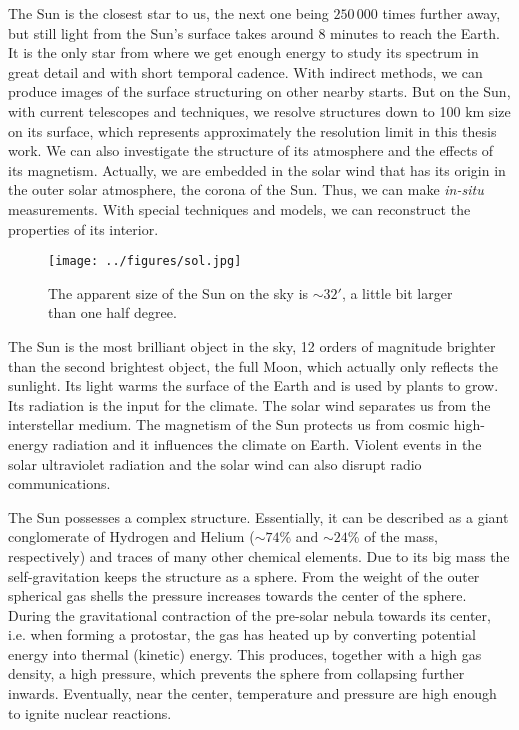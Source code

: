 The Sun is the closest star to us, the next one being $250\, 000$ times further away, but still light from the Sun's surface takes around 8 minutes to reach the Earth. It is the only star from where we get enough energy to study its spectrum in great detail and with short temporal cadence. With indirect methods, we can produce images of the surface structuring on other nearby starts. But on the Sun, with current telescopes and techniques, we resolve structures down to 100 km size on its surface, which represents approximately the resolution limit in this thesis work. We can also investigate the structure of its atmosphere and the effects of its magnetism. Actually, we are embedded in the solar wind that has its origin in the outer solar atmosphere, the corona of the Sun. Thus, we can make \emph{in-situ} measurements.  With special techniques and models, we can reconstruct the properties of its interior.
\pagebreak
\begin{wrapfigure}[14]{r}{0.5\textwidth}
\vspace{0.5cm}
\begin{center}
\texttt{[image: ../figures/sol.jpg]}
\caption{The apparent size of the Sun on the sky is $\sim32 ' $, a little bit larger than one half degree. }
\label{fig:foto:sol}
\end{center}
\end{wrapfigure}

The Sun is the most brilliant object in the sky, 12 orders of magnitude brighter than the second brightest object, the full Moon, which actually only reflects the sunlight.   Its light warms the surface of the Earth and is used by plants to grow. Its radiation is the input for the climate. The solar wind separates us from the interstellar medium. The magnetism of the Sun protects us from cosmic high-energy radiation and it influences the climate on Earth. Violent events in the solar ultraviolet radiation and the solar wind can also disrupt radio communications.

The  Sun possesses a complex structure. Essentially, it can be described as a giant conglomerate of Hydrogen and Helium ($\sim74$\% and $\sim24$\% of the mass, respectively) and traces of many other chemical elements. Due to its big mass the self-gravitation keeps the structure as a sphere. From the weight of the outer spherical gas shells the pressure increases towards the center of the sphere. During the gravitational contraction of the pre-solar nebula towards its center, i.e. when forming a protostar, the gas has heated up by converting potential energy into thermal (kinetic) energy. This produces, together with a high gas density, a high pressure, which prevents the sphere from collapsing further inwards. Eventually, near the center, temperature and pressure are high enough to ignite nuclear reactions.
